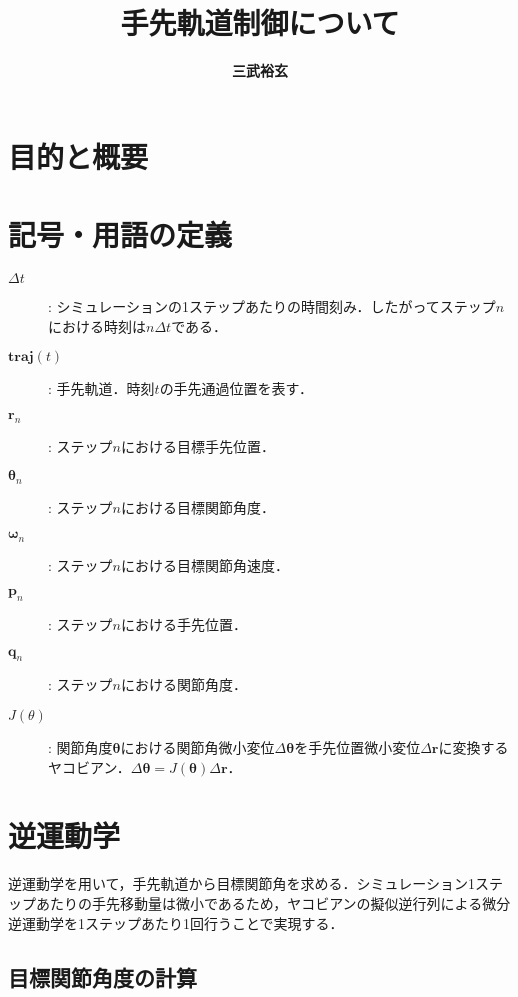 \documentclass[a4paper,10pt, twocolumn, fleqn]{jsarticle}
\title{\gtfamily\bfseries 手先軌道制御について}
\author{\gtfamily\bfseries 三武裕玄}
\begin{document}
\maketitle

\section{目的と概要}


\section{記号・用語の定義}

\begin{description}
\item[$\varDelta t$] :
シミュレーションの1ステップあたりの時間刻み．したがってステップ$n$における時刻は$n \varDelta t$である．

\item[$\bm{traj}(t)$] :
手先軌道．時刻$t$の手先通過位置を表す．

\item[$\bm{r}_n$] :
ステップ$n$における目標手先位置．

\item[$\bm{\theta}_n$] :
ステップ$n$における目標関節角度．

\item[$\bm{\omega}_n$] :
ステップ$n$における目標関節角速度．

\item[$\bm{p}_n$] :
ステップ$n$における手先位置．

\item[$\bm{q}_n$] :
ステップ$n$における関節角度．

\item[$J(\theta)$] :
関節角度$\bm{\theta}$における関節角微小変位$\varDelta\bm{\theta}$を手先位置微小変位$\varDelta\bm{r}$に変換するヤコビアン．$\varDelta\bm{\theta} = J(\bm{\theta}) \varDelta\bm{r}$．
\end{description}


\section{逆運動学}

逆運動学を用いて，手先軌道から目標関節角を求める．シミュレーション1ステップあたりの手先移動量は微小であるため，ヤコビアンの擬似逆行列による微分逆運動学を1ステップあたり1回行うことで実現する．

\subsection{目標関節角度の計算}
\end{document}
